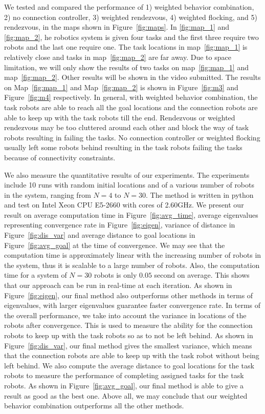 \documentclass[../main.tex]{subfiles}
\begin{document}
We tested and compared the performance of 1) weighted behavior combination, 2) no connection controller, 3) weighted rendezvous, 4) weighted flocking, and 5) rendezvous, in the maps shown in Figure~\ref{fig:maps}. In \ref{fig:map_1} and \ref{fig:map_2}, he robotics system is given four tasks and the first three require two robots and the last one require one. The task locations in map~\ref{fig:map_1} is relatively close and tasks in map~\ref{fig:map_2} are far away. Due to space limitation, we will only show the results of two tasks on map~\ref{fig:map_1} and map~\ref{fig:map_2}. Other results will be shown in the video submitted. The results on Map~\ref{fig:map_1} and Map~\ref{fig:map_2} is shown in Figure~\ref{fig:m3} and Figure~\ref{fig:m4} respectively. In general, with weighted behavior combination, the task robots are able to reach all the goal locations and the
connection robots are able to keep up with the task robots till the end. Rendezvous or weighted rendezvous may be too cluttered around each other and block the way of task robots resulting in failing the tasks. No connection controller or weighted flocking usually left some robots behind resulting in the task robots failing the tasks because of connectivity constraints.

We also measure the quantitative results of our experiments. The experiments include 10 runs with random initial locations and of a various number of robots in the system, ranging from $N=4$ to $N=30$. The method is written in python and test on Intel Xeon CPU E5-2660 with cores of 2.60GHz. We present our result on average computation time in Figure~\ref{fig:avg_time}, average eigenvalues representing convergence rate in Figure~\ref{fig:eigen}, variance of distance in Figure~\ref{fig:dis_var} and average distance to goal locations in Figure~\ref{fig:avg_goal} at the time of convergence. We may see that the computation time is approximately linear with the increasing number of robots in the system, thus it is scalable to a large number of robots. Also, the computation time for a system of $N=30$ robots is only $0.05$ second on average. This shows that our approach can be run in real-time at each iteration. As shown in Figure~\ref{fig:eigen}, our final method also outperforms other methods in terms of eigenvalues, with larger eigenvalues guarantee faster convergence rate. In terms of the overall performance, we take into account the variance in locations of the robots after convergence. This is used to measure the ability for the connection robots to keep up with the task robots so as to not be left behind. As shown in Figure~\ref{fig:dis_var}, our final method gives the smallest variance, which means that the connection robots are able to keep up with the task robot without being left behind. We also compute the average distance to goal locations for the task robots to measure the performance of completing assigned tasks for the task robots. As shown in Figure~\ref{fig:avg_goal}, our final method is able to give a result as good as the best one. Above all, we may conclude that our weighted behavior combination outperforms all the other methods.
\end{document}
